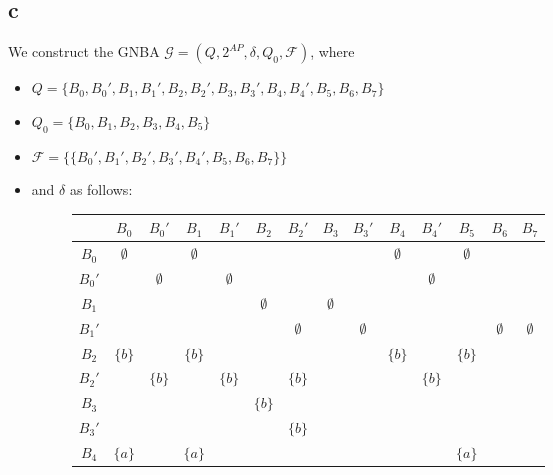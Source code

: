 \documentclass[11pt]{article}
\begin{document}
	\subsection{c}
	We construct the GNBA $\mathcal{G} = (Q,2^{AP}, \delta, Q_0, \mathcal{F})$, where 
	\begin{itemize}
		\item $Q = \{B_0,B_0',B_1,B_1',B_2,B_2',B_3, B_3', B_4, B_4', B_5,B_6,B_7\}$
		\item $Q_0 = \{B_0,B_1,B_2,B_3,B_4,B_5\}$
		\item $\mathcal{F} = \{\{B_0', B_1', B_2', B_3', B_4', B_5, B_6, B_7\}\}$
		\item and $\delta$ as follows:	\\
		
		\newcommand{\e}{$\emptyset$}
		\newcommand{\ab}{$\{a,b\}$}
		\newcommand{\x}{TODO}
		\begin{figure}[H]
			\begin{tabular}{c | ccccccccccccc}
				& $B_0$ & $B_0'$ & $B_1$ & $B_1'$ & $B_2$ & $B_2'$ & $B_3$ & $B_3'$ & $B_4$ & $B_4'$ & $B_5$ & $B_6$ & $B_7$ \\\hline
				$B_0$  & \e    &        & \e    &        &       &        &       &        & \e    &        & \e    &        & \\
				$B_0'$ &       & \e     &       & \e     &       &        &       &        &       & \e     &       &        & \\
				$B_1$  &       &        &       &        & \e    &        & \e    &        &       &        &       &        & \\
				$B_1'$ &       &        &       &        &       & \e     &       & \e     &       &        &       & \e     & \e\\
				$B_2$  &$\{b\}$&        &$\{b\}$&        &       &        &       &        &$\{b\}$&        &$\{b\}$&        & \\
				$B_2'$ &       & $\{b\}$&       & $\{b\}$&       & $\{b\}$&       &        &       & $\{b\}$&       &        & \\
				$B_3$  &       &        &       &        &$\{b\}$&        &       &        &       &        &       &        & \\
				$B_3'$ &       &        &       &        &       & $\{b\}$&       &        &       &        &       &        & \\
				$B_4$  &$\{a\}$&        &$\{a\}$&        &       &        &       &        &       &        &$\{a\}$&        & \\

\end{tabular}
\end{figure}
\end{itemize}
\end{document}
